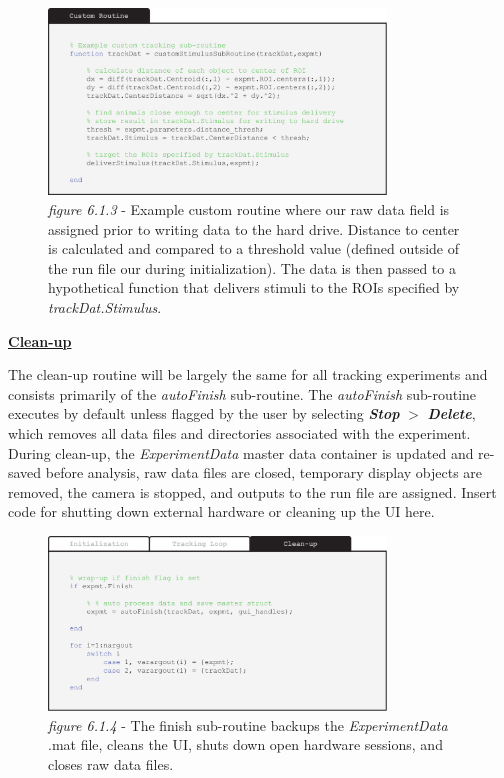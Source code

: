\documentclass[11pt]{article}
\begin{document}
\begin{figure}[h!]
	\begin{center}
		\includegraphics[width=0.8\textwidth]{images/custom_exp/custom_routine.pdf}
		\caption*{\footnotesize {\textit{figure 6.1.3} - Example custom routine where our raw data field is assigned prior to writing data to the hard drive. Distance to center is calculated and compared to a threshold value (defined outside of the run file our during initialization). The data is then passed to a hypothetical function that delivers stimuli to the ROIs specified by \textit{trackDat.Stimulus}.}}
	\end{center}
\end{figure}

\newpage
\textbf{\underline{Clean-up}}

The clean-up routine will be largely the same for all tracking experiments and consists primarily of the \textit{autoFinish} sub-routine. The \textit{autoFinish} sub-routine executes by default unless flagged by the user by selecting \textbf{\textit{Stop}} $>$ \textbf{\textit{Delete}}, which removes all data files and directories associated with the experiment. During clean-up, the \textit{ExperimentData} master data container is updated and re-saved before analysis, raw data files are closed, temporary display objects are removed, the camera is stopped, and outputs to the run file are assigned. Insert code for shutting down external hardware or cleaning up the UI here.

\begin{figure}[h!]
	\vspace*{0.75cm}
	\begin{center}
		\includegraphics[width=0.8\textwidth]{images/custom_exp/clean_up.pdf}
		\caption*{\footnotesize {\textit{figure 6.1.4} - The finish sub-routine backups the \textit{\textit{ExperimentData}} .mat file, cleans the UI, shuts down open hardware sessions, and closes raw data files.}}
	\end{center}
\end{figure}
\end{document}
